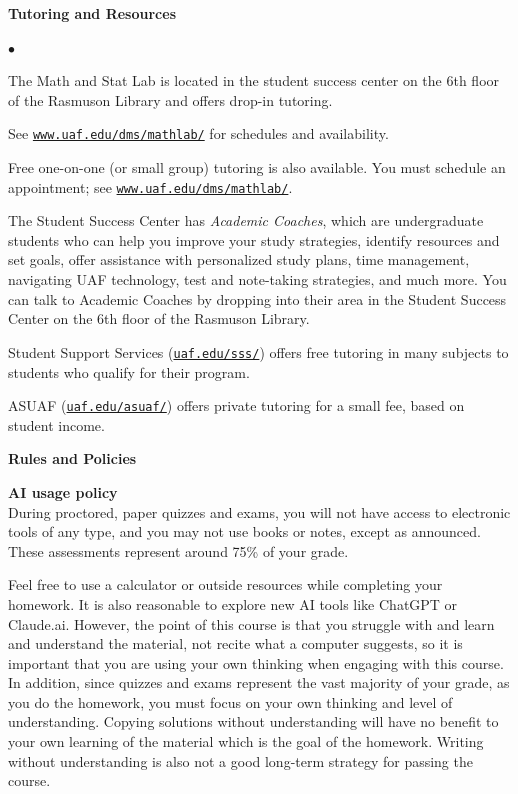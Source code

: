 \documentclass[11pt]{article}
\renewcommand{\emph}[1]{\textsf{\textbf{#1}}}
\newcommand{\localhead}[1]{\par\smallskip\textbf{#1} \smallskip\nobreak\\}%
\def\heading#1{\localhead{\large\emph{#1}}}
\def\subheading#1{\localhead{\emph{#1}}}
\newenvironment{clist}%
{\bgroup\parskip 0pt\begin{list}{$\bullet$}{\partopsep 4pt\topsep 0pt\itemsep -2pt}}%
{\end{list}\egroup}%
\begin{document}
\heading{Tutoring and Resources}
\vskip -30pt\strut
\begin{clist}
    \item The Math and Stat Lab is located in the 
      student success center on the 6th floor of the Rasmuson Library and
      offers drop-in tutoring.

	See 	\href{http://www.uaf.edu/dms/mathlab/}{\texttt{www.uaf.edu/dms/mathlab/}} for schedules and availability.
	\item Free
one-on-one (or small group) tutoring is also available. You must schedule an
appointment; see \href{http://www.uaf.edu/dms/mathlab/}{\texttt{www.uaf.edu/dms/mathlab/}}.
\item The Student Success Center has {\it Academic Coaches}, which are undergraduate students who can help you  improve your study strategies, identify resources and set goals, offer assistance with personalized study plans, time management,  navigating UAF technology, test and note-taking strategies, and much more. You can talk to Academic Coaches by dropping into their area in the Student Success Center on the 6th floor of the Rasmuson Library.
	\item Student Support Services (\href{https://uaf.edu/sss/}{\texttt{uaf.edu/sss/}}) offers free tutoring in many subjects to students who qualify for their program.
	\item ASUAF (\href{https://uaf.edu/asuaf/}{\texttt{uaf.edu/asuaf/}}) offers private tutoring for a small fee, based on student income.\\
\end{clist}

\heading{Rules and Policies}


\subheading{AI usage policy} 
During proctored, paper quizzes and exams, you will not have access to electronic tools of any type, and you may not use books or notes, except as announced.  These assessments represent around 75\% of your grade. 

Feel free to use a calculator or outside resources while completing your homework.  It is also reasonable to explore new AI tools like ChatGPT or Claude.ai. However, the point of this course is that you struggle with and learn and understand the material, not recite what a computer suggests, so it is important that you are using your own thinking when engaging with this course. In addition, since quizzes and exams represent the vast majority of your grade, as you do the homework, you must focus on your own thinking and level of understanding. Copying solutions without understanding will have no benefit to your own learning of the material which is the goal of the homework.  Writing without understanding is also not a good long-term strategy for passing the course. 
  
\end{document}
